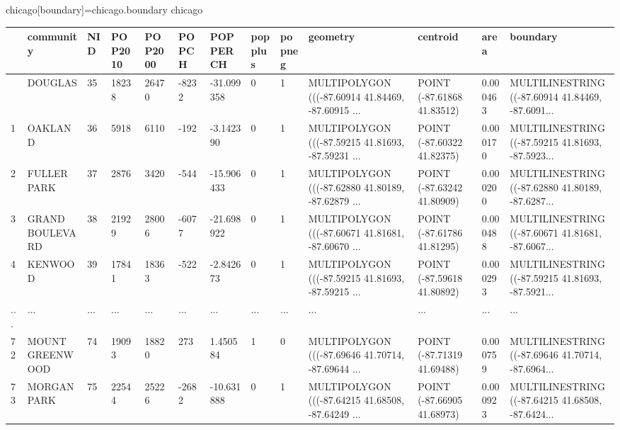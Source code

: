 \documentclass[
  letterpaper,
  DIV=11,
  numbers=noendperiod]{scrreprt}
\newenvironment{Shaded}{\begin{snugshade}}{\end{snugshade}}
\newcommand{\NormalTok}[1]{\textcolor[rgb]{0.00,0.23,0.31}{#1}}
\newcommand{\OperatorTok}[1]{\textcolor[rgb]{0.37,0.37,0.37}{#1}}
\newcommand{\StringTok}[1]{\textcolor[rgb]{0.13,0.47,0.30}{#1}}
\begin{document}
\begin{Shaded}
\begin{Highlighting}[]
\NormalTok{chicago[}\StringTok{\textquotesingle{}boundary\textquotesingle{}}\NormalTok{]}\OperatorTok{=}\NormalTok{chicago.boundary}
\NormalTok{chicago}
\end{Highlighting}
\end{Shaded}

\begin{longtable}[]{@{}lllllllllllll@{}}
\toprule\noalign{}
& community & NID & POP2010 & POP2000 & POPCH & POPPERCH & popplus &
popneg & geometry & centroid & area & boundary \\
\midrule\noalign{}
\endhead
\bottomrule\noalign{}
\endlastfoot
0 & DOUGLAS & 35 & 18238 & 26470 & -8232 & -31.099358 & 0 & 1 &
MULTIPOLYGON (((-87.60914 41.84469, -87.60915 ... & POINT (-87.61868
41.83512) & 0.000463 & MULTILINESTRING ((-87.60914 41.84469,
-87.6091... \\
1 & OAKLAND & 36 & 5918 & 6110 & -192 & -3.142390 & 0 & 1 & MULTIPOLYGON
(((-87.59215 41.81693, -87.59231 ... & POINT (-87.60322 41.82375) &
0.000170 & MULTILINESTRING ((-87.59215 41.81693, -87.5923... \\
2 & FULLER PARK & 37 & 2876 & 3420 & -544 & -15.906433 & 0 & 1 &
MULTIPOLYGON (((-87.62880 41.80189, -87.62879 ... & POINT (-87.63242
41.80909) & 0.000200 & MULTILINESTRING ((-87.62880 41.80189,
-87.6287... \\
3 & GRAND BOULEVARD & 38 & 21929 & 28006 & -6077 & -21.698922 & 0 & 1 &
MULTIPOLYGON (((-87.60671 41.81681, -87.60670 ... & POINT (-87.61786
41.81295) & 0.000488 & MULTILINESTRING ((-87.60671 41.81681,
-87.6067... \\
4 & KENWOOD & 39 & 17841 & 18363 & -522 & -2.842673 & 0 & 1 &
MULTIPOLYGON (((-87.59215 41.81693, -87.59215 ... & POINT (-87.59618
41.80892) & 0.000293 & MULTILINESTRING ((-87.59215 41.81693,
-87.5921... \\
... & ... & ... & ... & ... & ... & ... & ... & ... & ... & ... & ... &
... \\
72 & MOUNT GREENWOOD & 74 & 19093 & 18820 & 273 & 1.450584 & 1 & 0 &
MULTIPOLYGON (((-87.69646 41.70714, -87.69644 ... & POINT (-87.71319
41.69488) & 0.000759 & MULTILINESTRING ((-87.69646 41.70714,
-87.6964... \\
73 & MORGAN PARK & 75 & 22544 & 25226 & -2682 & -10.631888 & 0 & 1 &
MULTIPOLYGON (((-87.64215 41.68508, -87.64249 ... & POINT (-87.66905
41.68973) & 0.000923 & MULTILINESTRING ((-87.64215 41.68508,
-87.6424... \\

\end{longtable}
\end{document}
